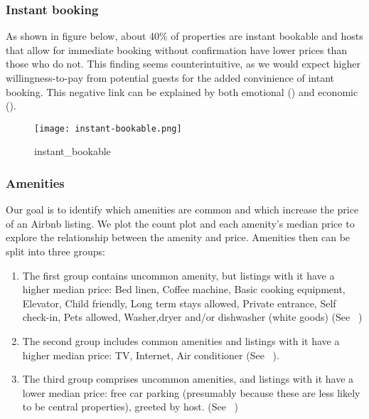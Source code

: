 \subsubsection*{Instant booking}

As shown in figure below, about 40\% of properties are instant bookable and
hosts that allow for immediate booking without confirmation  have lower prices
than those who do not. This finding seems counterintuitive, as we would expect
higher willingness-to-pay from potential guests for the added convinience of
intant booking.  This negative link can be explained by both emotional
(\textcite{wang2017price}) and economic (\textcite{benitez2018flexible}).

\begin{figure}[!htbp]
    \centering
    \texttt{[image: instant-bookable.png]}
    \caption{instant\_bookable}
    \label{fig:instant_bookable}
\end{figure}

\subsubsection*{Amenities}

Our goal is to identify which amenities are common and which increase the price
of an Airbnb listing. We plot the count plot and each amenity's
median price to explore the relationship between the amenity and price.
Amenities then can be split into three groups:

\begin{enumerate}

  \item The first group contains uncommon amenity, but listings with it have a
    higher median price: Bed linen, Coffee machine, Basic cooking equipment,
    Elevator, Child friendly, Long term stays allowed, Private entrance, Self
    check-in, Pets allowed, Washer,dryer and/or dishwasher (white goods)
    (See
    ~)

  \item The second group includes common amenities and listings with it have a
      higher median price: TV, Internet, Air conditioner (See
      ~).

  \item The third group comprises uncommon amenities, and listings with it have
      a lower median price:  free car parking (presumably because these are less
      likely to be central properties), greeted by host. (See
      ~)

\end{enumerate}

